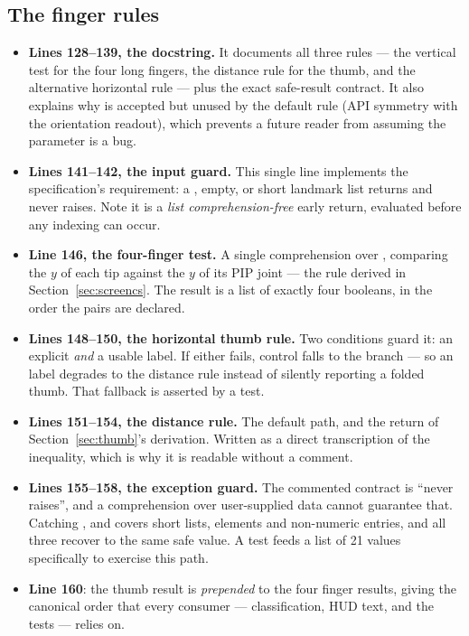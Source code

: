 \subsection{The finger rules}

\begin{codecard}

\end{codecard}

\begin{itemize}
  \item \textbf{Lines 128--139, the docstring.} It documents all three rules --- the vertical test for
        the four long fingers, the distance rule for the thumb, and the alternative horizontal rule
        --- plus the exact safe-result contract. It also explains why  is accepted but
        unused by the default rule (API symmetry with the orientation readout), which prevents a
        future reader from assuming the parameter is a bug.
  \item \textbf{Lines 141--142, the input guard.} This single line implements the specification's
        requirement: a , empty, or short landmark list returns
         and never raises. Note it is a \emph{list comprehension-free} early
        return, evaluated before any indexing can occur.
  \item \textbf{Line 146, the four-finger test.} A single comprehension over ,
        comparing the $y$ of each tip against the $y$ of its PIP joint --- the rule derived in
        Section~\ref{sec:screencs}. The result is a list of exactly four booleans, in the order the
        pairs are declared.
  \item \textbf{Lines 148--150, the horizontal thumb rule.} Two conditions guard it: an explicit
         \emph{and} a usable label. If either fails, control falls to
        the  branch --- so an  label degrades to the distance rule instead
        of silently reporting a folded thumb. That fallback is asserted by a test.
  \item \textbf{Lines 151--154, the distance rule.} The default path, and the return of
        Section~\ref{sec:thumb}'s derivation. Written as a direct transcription of the inequality,
        which is why it is readable without a comment.
  \item \textbf{Lines 155--158, the exception guard.} The commented contract is ``never raises'',
        and a comprehension over user-supplied data cannot guarantee that. Catching
        ,  and  covers short lists, 
        elements and non-numeric entries, and all three recover to the same safe value. A test feeds
        a list of 21  values specifically to exercise this path.
  \item \textbf{Line 160}: the thumb result is \emph{prepended} to the four finger results, giving
        the canonical  order that every consumer ---
        classification, HUD text, and the tests --- relies on.
\end{itemize}

